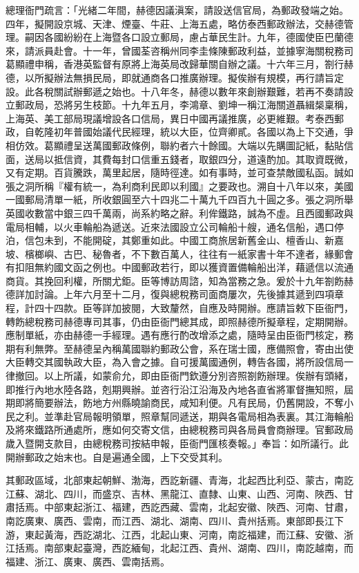 \begin{pinyinscope}
總理衙門疏言：「光緒二年間，赫德因議滇案，請設送信官局，為郵政發端之始。四年，擬開設京城、天津、煙臺、牛莊、上海五處，略仿泰西郵政辦法，交赫德管理。嗣因各國紛紛在上海暨各口設立郵局，慮占華民生計。九年，德國使臣巴蘭德來，請派員赴會。十一年，曾國荃咨稱州同李圭條陳郵政利益，並據寧海關稅務司葛顯禮申稱，香港英監督有原將上海英局改歸華關自辦之議。十六年三月，劄行赫德，以所擬辦法無損民局，即就通商各口推廣辦理。擬俟辦有規模，再行請旨定設。此各稅關試辦郵遞之始也。十八年冬，赫德以數年來創辦艱難，若再不奏請設立郵政局，恐將另生枝節。十九年五月，李鴻章、劉坤一稱江海關道聶緝椝稟稱，上海英、美工部局現議增設各口信局，異日中國再議推廣，必更維艱。考泰西郵政，自乾隆初年普國始議代民經理，統以大臣，位齊卿貳。各國以為上下交通，爭相仿效。葛顯禮呈送萬國郵政條例，聯約者六十餘國。大端以先購圖記紙，黏貼信面，送局以抵信資，其費每封口信重五錢者，取銀四分，道遠酌加。其取資既微，又有定期。百貨騰跌，萬里起居，隨時徑達。如有事時，並可查禁敵國私函。誠如張之洞所稱『權有統一，為利商利民即以利國』之要政也。溯自十八年以來，美國一國郵局清單一紙，所收銀圓至六十四兆二十萬九千四百九十圓之多。張之洞所舉英國收數當中銀三四千萬兩，尚系約略之辭。利侔鐵路，誠為不虛。且西國郵政與電局相輔，以火車輪船為遞送。近來法國設立公司輪船十艘，通名信船，遇口停泊，信包未到，不能開碇，其鄭重如此。中國工商旅居新舊金山、檀香山、新嘉坡、檳榔嶼、古巴、秘魯者，不下數百萬人，往往有一紙家書十年不達者，緣郵會有扣阻無約國文函之例也。中國郵政若行，即以獲資置備輪船出洋，藉遞信以流通商貨。其挽回利權，所關尤鉅。臣等博訪周諮，知為當務之急。爰於十九年劄飭赫德詳加討論。上年六月至十二月，復與總稅務司面商屢次，先後據其遞到四項章程，計四十四款。臣等詳加披閱，大致釐然，自應及時開辦。應請旨敕下臣衙門，轉飭總稅務司赫德專司其事，仍由臣衙門總其成，即照赫德所擬章程，定期開辦。應制單紙，亦由赫德一手經理。遇有應行酌改增添之處，隨時呈由臣衙門核定，務期有利無弊。至赫德呈內稱萬國聯約郵政公會，系在瑞士國，應備照會，寄由出使大臣轉交其國執政大臣，為入會之據。自可援萬國通例，轉告各國，將所設信局一律撤回。以上所議，如蒙俞允，即由臣衙門欽遵分別咨照劄飭辦理。俟辦有頭緒，即推行內地水陸各路，剋期興辦。並咨行沿江沿海及內地各直省將軍督撫知照，屆期即將簡要辦法，飭地方州縣曉諭商民，咸知利便。凡有民局，仍舊開設，不奪小民之利。並準赴官局報明領單，照章幫同遞送，期與各電局相為表裏。其江海輪船及將來鐵路所通處所，應如何交寄文信，由總稅務司與各局員會商辦理。官郵政局歲入暨開支款目，由總稅務司按結申報，臣衙門匯核奏報。」奉旨：如所議行。此開辦郵政之始末也。自是遍通全國，上下交受其利。

其郵政區域，北部東起朝鮮、渤海，西訖新疆、青海，北起西比利亞、蒙古，南訖江蘇、湖北、四川，而盛京、吉林、黑龍江、直隸、山東、山西、河南、陜西、甘肅括焉。中部東起浙江、福建，西訖西藏、雲南，北起安徽、陜西、河南、甘肅，南訖廣東、廣西、雲南，而江西、湖北、湖南、四川、貴州括焉。東部即長江下游，東起黃海，西訖湖北、江西，北起山東、河南，南訖福建，而江蘇、安徽、浙江括焉。南部東起臺灣，西訖緬甸，北起江西、貴州、湖南、四川，南訖越南，而福建、浙江、廣東、廣西、雲南括焉。


\end{pinyinscope}
